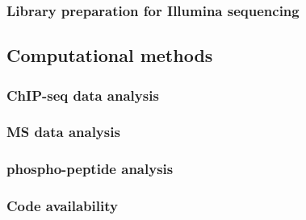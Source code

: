 \subsubsection{Library preparation for Illumina sequencing}
\subsection{Computational methods}
\subsubsection{ChIP-seq data analysis}
\subsubsection{MS data analysis}
\subsubsection{phospho-peptide analysis}
\subsubsection{Code availability}
